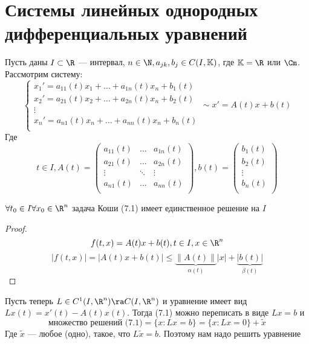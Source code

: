
\section{Системы линейных однородных дифференциальных уравнений}
Пусть даны \(I \subset \R\) --- интервал, \(n \in \N, a_{jk}, b_j \in C(I, \mathbb{K})\), где \(\mathbb{K} = \R\) или \(\Cm\). Рассмотрим систему:
\begin{equation}
    \begin{cases}
        x_1' = a_{11}(t)x_1 + \dots + a_{1n}(t)x_n + b_1(t) \\
        x_2' = a_{21}(t)x_2 + \dots + a_{2n}(t)x_n + b_2(t) \\
        \vdots \\
        x_n' = a_{n1}(t)x_n + \dots + a_{nn}(t)x_n + b_n(t) \\
    \end{cases}
    \sim x' = A(t)x + b(t)
\end{equation}
Где
\[t \in I, A(t) = \left( \begin{array}{ccc}
    a_{11}(t) & \dots & a_{1n}(t) \\
    a_{21}(t) & \dots & a_{2n}(t) \\
    \vdots & \ddots & \vdots \\
    a_{n1}(t) & \dots & a_{nn}(t) \\
\end{array} \right), b(t) = \left( \begin{array}{c}
    b_1(t) \\
    b_2(t) \\
    \vdots \\
    b_n(t) \\
\end{array} \right)\]

\begin{corollary}
    \(\forall t_0 \in I \forall x_0 \in \R^n\) задача Коши (7.1) имеет единственное решение на \(I\)
\end{corollary}
\begin{proof}
    \[f(t, x) = A(t)x + b(t), t \in I, x \in \R^n\]
    \[|f(t, x)| = |A(t)x + b(t)| \le \underbrace{\|A(t)\|}_{\alpha(t)}|x| + \underbrace{|b(t)|}_{\beta(t)}\]
\end{proof}

Пусть теперь \(L \in C^1(I, \R^n) \ra C(I, \R^n)\) и уравнение имеет вид \(Lx(t) = x'(t) - A(t)x(t)\). Тогда (7.1) можно переписать в виде \(Lx = b\) и 
\[\text{множество решений (7.1)} = \{x: Lx = b\} = \{x: Lx = 0\} + \tilde{x}\]
Где \(\tilde{x}\) --- любое (одно), такое, что \(L\tilde{x} = b\). Поэтому нам надо решить уравнение


